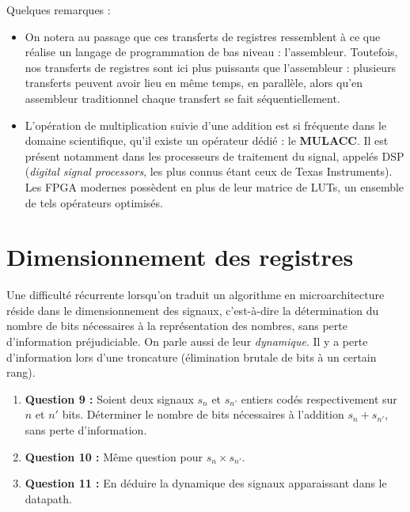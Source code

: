 \documentclass[a4paper,11pt]{article}
\begin{document}
\begin{solbox}
\vspace{1em}
Quelques remarques :
\begin{itemize}
    \item On notera au passage que ces transferts de registres ressemblent à ce que réalise un langage de programmation de bas niveau : l'assembleur. Toutefois, nos transferts de registres sont ici plus puissants que l'assembleur : plusieurs transferts peuvent avoir lieu en même temps, en parallèle, alors qu'en assembleur traditionnel chaque transfert se fait séquentiellement.
    \item L'opération de multiplication suivie d'une addition est si fréquente dans le domaine scientifique, qu'il existe un opérateur dédié : le \textbf{MULACC}. Il est présent notamment dans les processeurs de traitement du signal, appelés DSP (\textit{digital signal processors}, les plus connus étant ceux de Texas Instruments). Les FPGA modernes possèdent en plus de leur matrice de LUTs, un ensemble de tels opérateurs optimisés.
\end{itemize}
\end{solbox}
\fi



\section{Dimensionnement des registres}

Une difficulté récurrente lorsqu'on traduit un algorithme en microarchitecture réside dans le dimensionnement des signaux, c'est-à-dire la détermination du nombre de bits nécessaires à la représentation des nombres, sans perte d'information préjudiciable. On parle aussi de leur \textit{dynamique}. Il y a perte d'information lors d'une troncature (élimination brutale de bits à un certain rang).

\begin{questionbox}
\begin{enumerate}
    \item \textbf{Question 9 :} Soient deux signaux $s_n$ et $s_{n'}$ entiers codés respectivement sur $n$ et $n'$ bits. Déterminer le nombre de bits nécessaires à l'addition $s_n+s_{n'}$, sans perte d'information.
    \item \textbf{Question 10 :} Même question pour $s_n \times s_{n'}$.
    \item \textbf{Question 11 :} En déduire la dynamique des signaux apparaissant dans le datapath.
\end{enumerate}
\end{questionbox}
\end{document}
